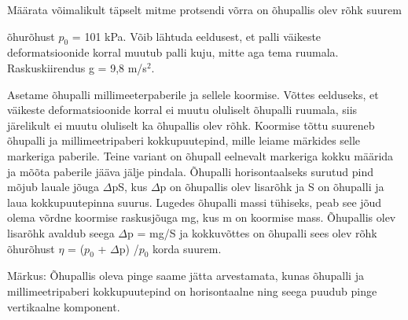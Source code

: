 
Määrata võimalikult täpselt mitme protsendi võrra on õhupallis olev rõhk suurem

õhurõhust $p_0$ = 101 kPa. Võib lähtuda eeldusest, et palli väikeste deformatsioonide korral muutub palli kuju, mitte aga tema ruumala. Raskuskiirendus g = 9,8 m/s$^2$.

\hint

\solu
Asetame õhupalli millimeeterpaberile ja sellele koormise. Võttes eelduseks, et väikeste deformatsioonide korral ei muutu oluliselt õhupalli ruumala, siis järelikult ei muutu oluliselt ka õhupallis olev rõhk. Koormise tõttu suureneb õhupalli ja millimeetripaberi kokkupuutepind, mille leiame märkides selle markeriga paberile. Teine variant on õhupall eelnevalt markeriga kokku määrida ja mõõta paberile jääva jälje pindala. Õhupalli horisontaalseks surutud pind mõjub lauale jõuga $\Delta$pS, kus $\Delta$p on õhupallis olev lisarõhk ja S on õhupalli ja laua kokkupuutepinna suurus. Lugedes õhupalli massi tühiseks, peab see jõud olema võrdne koormise raskusjõuga mg, kus m on koormise mass. Õhupallis olev lisarõhk avaldub seega $\Delta$p = mg/S ja kokkuvõttes on õhupalli sees olev rõhk õhurõhust $\eta$ = ($p_0$ + $\Delta$p) /$p_0$ korda suurem.

Märkus: Õhupallis oleva pinge saame jätta arvestamata, kunas õhupalli ja millimeetripaberi kokkupuutepind on horisontaalne ning seega puudub pinge vertikaalne komponent.
\probend
